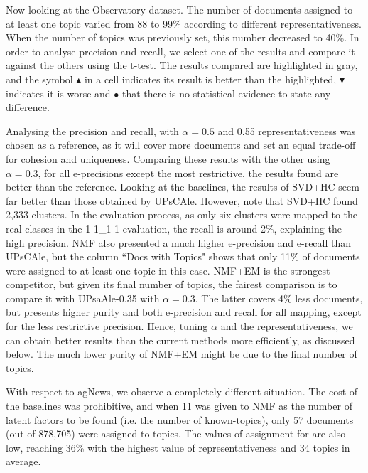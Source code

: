 Now looking at the Observatory dataset. 
The number of documents assigned to at least one topic varied from 88 to 99\% according to different representativeness.
When the number of topics was previously set, this number decreased to 40\%. 
In order to analyse precision and recall, we select one of the results and compare it against the others using the t-test. The results compared are highlighted in gray, and the symbol \textcolor[rgb]{00,0.45,0.10}{$\blacktriangle$} in a cell indicates its result is better than the highlighted, \textcolor[rgb] {0.7,00,00}{$\blacktriangledown$} indicates it is worse and \textcolor[rgb]{0.7,0.7,0.0}{$\bullet$} that there is no statistical evidence to state any difference.







Analysing the precision and recall, \method with $\alpha=0.5$ and 0.55 representativeness was chosen as a reference, as it will cover more documents and set an equal trade-off for cohesion and uniqueness. Comparing these results with the other using $\alpha=0.3$, for all e-precisions except the most restrictive, the results found are better than the reference. Looking at the baselines, the results of SVD+HC seem far better than those obtained by UPsCAle. However, note that SVD+HC found 2,333 clusters. In the evaluation process, as only six clusters were mapped to the real classes in the 1-1\_1-1 evaluation, the recall is around 2\%, explaining the high precision. NMF also presented a much higher e-precision and e-recall than UPsCAle, but the column ``Docs with Topics" shows that only 11\% of documents were assigned to at least one topic in this case. NMF+EM is the strongest competitor, but given its final number of topics, the fairest comparison is to compare it with UPsaAle-0.35 with $\alpha=0.3$. The latter covers 4\% less documents, but presents higher purity and both e-precision and recall for all mapping, except for the less restrictive precision. Hence, tuning $\alpha$ and the representativeness, we can obtain better results than the current methods more efficiently, as discussed below.  
The much lower purity of NMF+EM might be due to the final number of topics. %


With respect to agNews, we observe a completely different situation. The cost of the baselines was prohibitive, and when 11 was given to NMF as the number of latent factors to be found (i.e. the number of known-topics), only 57 documents (out of 878,705) were assigned to topics. The values of assignment for \method are also low, reaching 36\% with the highest value of representativeness and 34 topics in average.

